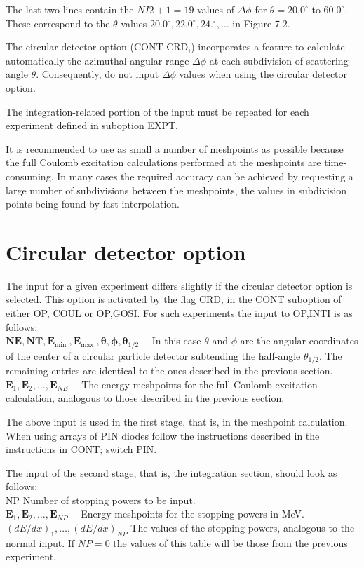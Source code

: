 \documentclass[10pt]{article}
\begin{document}
The last two lines contain the $N I 2+1=19$ values of $\Delta \phi$ for $\theta=20.0^{\circ}$ to $60.0^{\circ}$. These correspond to the $\theta$ values $20.0^{\circ}, 22.0^{\circ}, 24 .^{\circ}, \ldots$ in Figure 7.2.

The circular detector option (CONT CRD,) incorporates a feature to calculate automatically the azimuthal angular range $\Delta \phi$ at each subdivision of scattering angle $\theta$. Consequently, do not input $\Delta \phi$ values when using the circular detector option.

The integration-related portion of the input must be repeated for each experiment defined in suboption EXPT.

It is recommended to use as small a number of meshpoints as possible because the full Coulomb excitation calculations performed at the meshpoints are time-consuming. In many cases the required accuracy can be achieved by requesting a large number of subdivisions between the meshpoints, the values in subdivision points being found by fast interpolation.

\section*{Circular detector option}
The input for a given experiment differs slightly if the circular detector option is selected. This option is activated by the flag CRD, in the CONT suboption of either OP, COUL or OP,GOSI. For such experiments the input to OP,INTI is as follows:\\
$\mathbf{N E}, \mathbf{N T}, \mathbf{E}_{\text {min }}, \mathbf{E}_{\text {max }}, \boldsymbol{\theta}, \boldsymbol{\phi}, \boldsymbol{\theta}_{1 / 2} \quad$ In this case $\theta$ and $\phi$ are the angular coordinates of the center of a circular particle detector subtending the half-angle $\theta_{1 / 2}$. The remaining entries are identical to the ones described in the previous section.\\
$\mathbf{E}_{1}, \mathbf{E}_{2}, \ldots, \mathbf{E}_{N E} \quad$ The energy meshpoints for the full Coulomb excitation calculation, analogous to those described in the previous section.

The above input is used in the first stage, that is, in the meshpoint calculation. When using arrays of PIN diodes follow the instructions described in the instructions in CONT; switch PIN.

The input of the second stage, that is, the integration section, should look as follows:\\
NP Number of stopping powers to be input.\\
$\mathbf{E}_{1}, \mathbf{E}_{2}, \ldots, \mathbf{E}_{N P} \quad$ Energy meshpoints for the stopping powers in MeV.\\
$(d E / d x)_{1}, \ldots,(d E / d x)_{N P}$ The values of the stopping powers, analogous to the normal input. If $N P=0$ the values of this table will be those from the previous experiment.
\end{document}
